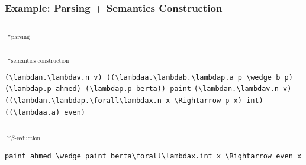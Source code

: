 \begin{frame}[fragile]
    \frametitle{Example: Parsing + Semantics Construction}
    \begin{autowidthenv}
    {\centering{}\par}\vspace{1em}
    \hspace{0.49\textwidth}$\downarrow_{\text{parsing}}$\par\vspace{1em}
    {\centering\color{logicfont!50!nlfont} \par}\vspace{1em}
    \hspace{0.49\textwidth}$\downarrow_{\text{semantics construction}}$\par\vspace{1em}
    {\centering\begin{adjustbox}{}\color{logicfont}\footnotesize\ifx\switchtomathexample\undefined
        \lstinline[language=MMT,basicstyle=\scriptsize\ttfamily]|(\lambdan.\lambdav.n v) ((\lambdaa.\lambdab.\lambdap.a p \wedge b p) (\lambdap.p ahmed) (\lambdap.p berta)) paint|\else
                    \lstinline[language=MMT]|(\lambdan.\lambdav.n v) ((\lambdan.\lambdap.\forall\lambdax.n x \Rightarrow p x) int) ((\lambdaa.a) even)|
                \fi
    \end{adjustbox}\par}\vspace{1em}
    \hspace{0.49\textwidth}$\downarrow_{\text{$\beta$-reduction}}$\par\vspace{1em}
{\centering\color{logicfont}\small\begin{adjustbox}{}\ifx\switchtomathexample\undefined\lstinline[language=MMT]|paint ahmed \wedge paint berta|\else\lstinline[language=MMT]|\forall\lambdax.int x \Rightarrow even x|\fi\end{adjustbox}\par}
    \end{autowidthenv}
\end{frame}

